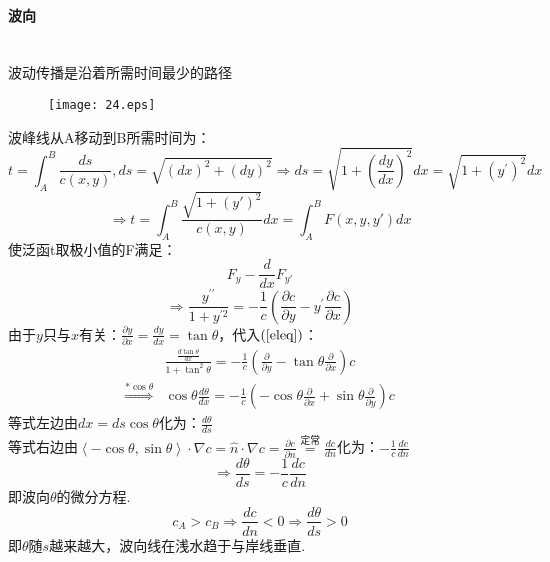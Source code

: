 \documentclass[a4paper,12pt]{article}
\begin{document}
    \paragraph{波向}~{}\\
    波动传播是沿着所需时间最少的路径
    \begin{figure}[H]
    \centering \texttt{[image: 24.eps]}
    \caption*{}
    \end{figure}
    波峰线从A移动到B所需时间为：
    \[
        t=\int_A^B\frac{ds}{c(x,y)},ds=\sqrt{(d x)^{2}+(d y)^{2}} \Rightarrow d s=\sqrt{1+\left(\frac{d y}{d x}\right)^{2}} d x=\sqrt{1+\left(y^{\prime}\right)^{2}} d x
    \]
    \[
        \Rightarrow t=\int_A^B\frac{\sqrt{1+(y')^2}}{c(x,y)}dx=\int_A^B F(x,y,y')dx
    \]
    使泛函t取极小值的F满足：
    \[
        F_y-\frac{d}{dx}F_{y'}
    \]
    \begin{equation}
        \Rightarrow \frac{y^{\prime \prime}}{1+y^{\prime 2}}=-\frac{1}{c}\left(\frac{\partial c}{\partial y}-y^{\prime} \frac{\partial c}{\partial x}\right)\label{eleq}
    \end{equation}
    由于$y$只与$x$有关：$\displaystyle \frac{\partial y}{\partial x}=\frac{d y}{d x}=\operatorname{tan} \theta$，代入$(\ref{eleq})$：
    \[
        \begin{aligned}
        &\frac{\frac{d\tan \theta}{dx}}{1+\tan^2\theta}=-\frac{1}{c}\left(\frac{\partial}{\partial y}-\tan \theta \frac{\partial}{\partial x}\right)c\\
        \mathop{\Longrightarrow}\limits^{*\cos\theta}& \cos\theta\frac{d\theta}{dx}=-\frac{1}{c}\left(-\cos\theta\frac{\partial}{\partial x}+\sin\theta\frac{\partial}{\partial y}\right)c
        \end{aligned}
    \]
    等式左边由$\displaystyle dx=ds\cos\theta$化为：$\displaystyle \frac{d\theta}{ds}$\\
    等式右边由$\displaystyle \left\langle-\cos\theta,\sin\theta\right\rangle\cdot\nabla c=\hat{n}\cdot\nabla c=\frac{\partial c}{\partial n}\mathop{=}\limits^{\mbox{定常}}\frac{dc}{dn}$化为：$\displaystyle -\frac{1}{c}\frac{dc}{dn}$
    \[
        \Rightarrow \frac{d \theta}{d s}=-\frac{1}{c} \frac{d c}{d n}
    \]
    即波向$\theta$的微分方程.\\
    \[
        \displaystyle c_A>c_B\Rightarrow\frac{dc}{dn}<0\Rightarrow\frac{d\theta}{ds}>0
    \] 
    即$\theta$随$s$越来越大，波向线在浅水趋于与岸线垂直.\\
\end{document}
